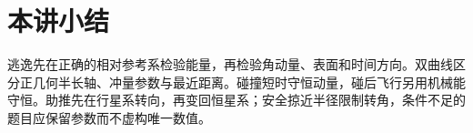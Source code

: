 \section{本讲小结}
逃逸先在正确的相对参考系检验能量，再检验角动量、表面和时间方向。双曲线区分正几何半长轴、冲量参数与最近距离。碰撞短时守恒动量，碰后飞行另用机械能守恒。助推先在行星系转向，再变回恒星系；安全掠近半径限制转角，条件不足的题目应保留参数而不虚构唯一数值。
